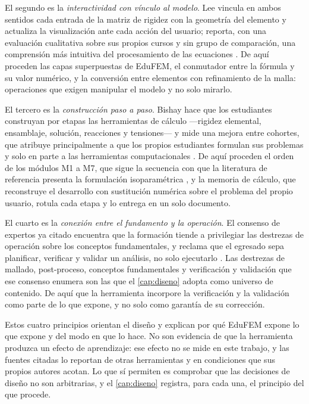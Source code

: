 El segundo es la \emph{interactividad con vínculo al modelo}. Lee vincula en ambos sentidos cada entrada de la matriz de rigidez con la geometría del elemento y actualiza la visualización ante cada acción del usuario; reporta, con una evaluación cualitativa sobre sus propios cursos y sin grupo de comparación, una comprensión más intuitiva del procesamiento de las ecuaciones \autocites[pp.~158, 163, 166, 168]{lee2015interactive}[p.~874]{lee2015eigenmodes}. De aquí proceden las capas superpuestas de EduFEM, el conmutador entre la fórmula y su valor numérico, y la conversión entre elementos con refinamiento de la malla: operaciones que exigen manipular el modelo y no solo mirarlo.

El tercero es la \emph{construcción paso a paso}. Bishay hace que los estudiantes construyan por etapas las herramientas de cálculo —rigidez elemental, ensamblaje, solución, reacciones y tensiones— y mide una mejora entre cohortes, que atribuye principalmente a que los propios estudiantes formulan sus problemas y solo en parte a las herramientas computacionales \autocite[pp.~1010-1011, 1019, 1023]{bishay2020teaching}. De aquí proceden el orden de los módulos M1 a M7, que sigue la secuencia con que la literatura de referencia presenta la formulación isoparamétrica \autocites[pp.~339-347]{bathe2014fem}{cook2002concepts}, y la memoria de cálculo, que reconstruye el desarrollo con sustitución numérica sobre el problema del propio usuario, rotula cada etapa y lo entrega en un solo documento.

El cuarto es la \emph{conexión entre el fundamento y la operación}. El consenso de expertos ya citado encuentra que la formación tiende a privilegiar las destrezas de operación sobre los conceptos fundamentales, y reclama que el egresado sepa planificar, verificar y validar un análisis, no solo ejecutarlo \autocite[pp.~1159, 1168]{perezsantiago2023fem}. Las destrezas de mallado, post-proceso, conceptos fundamentales y verificación y validación que ese consenso enumera \autocite[p.~1163]{perezsantiago2023fem} son las que el \autoref{cap:diseno} adopta como universo de contenido. De aquí que la herramienta incorpore la verificación y la validación como parte de lo que expone, y no solo como garantía de su corrección.

Estos cuatro principios orientan el diseño y explican por qué EduFEM expone lo que expone y del modo en que lo hace. No son evidencia de que la herramienta produzca un efecto de aprendizaje: ese efecto no se mide en este trabajo, y las fuentes citadas lo reportan de otras herramientas y en condiciones que sus propios autores acotan. Lo que sí permiten es comprobar que las decisiones de diseño no son arbitrarias, y el \autoref{cap:diseno} registra, para cada una, el principio del que procede.

